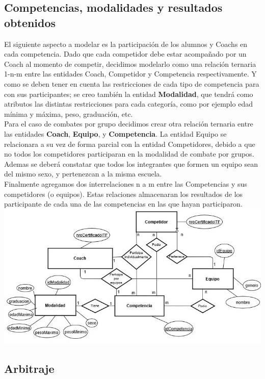 \newpage
\subsection{Competencias, modalidades y resultados obtenidos}

El siguiente aspecto a modelar es la participación de los alumnos y Coachs en cada competencia. Dado que cada competidor debe estar acompañado por un Coach al momento de competir, decidimos modelarlo como una relación ternaria 1-n-m entre las entidades Coach, Competidor y Competencia respectivamente. Y como se deben tener en cuenta las restricciones de cada tipo de competencia para con sus participantes; se creo también la entidad \textbf{Modalidad}, que tendrá como atributos las distintas restricciones para cada categoría, como por ejemplo edad mínima y máxima, peso, graduación, etc.\\

Para el caso de combates por grupo decidimos crear otra relación ternaria entre las entidades \textbf{Coach}, \textbf{Equipo}, y \textbf{Competencia}. La entidad Equipo se relacionara a su vez de forma parcial con la entidad Competidores, debido a que no todos los competidores participaran en la modalidad de combate por grupos. Ademas se deberá constatar que todos los integrantes que formen un equipo  sean del mismo sexo, y pertenezcan a la misma escuela.\\

Finalmente agregamos dos interrelaciones n a m entre las Competencias y sus competidores (o equipos). Estas relaciones almacenaran los resultados de los participante de cada una de las competencias en las que hayan participaron.\\

\includegraphics[scale=0.75]{competenciaDiag.jpg}


\subsection{Arbitraje}

